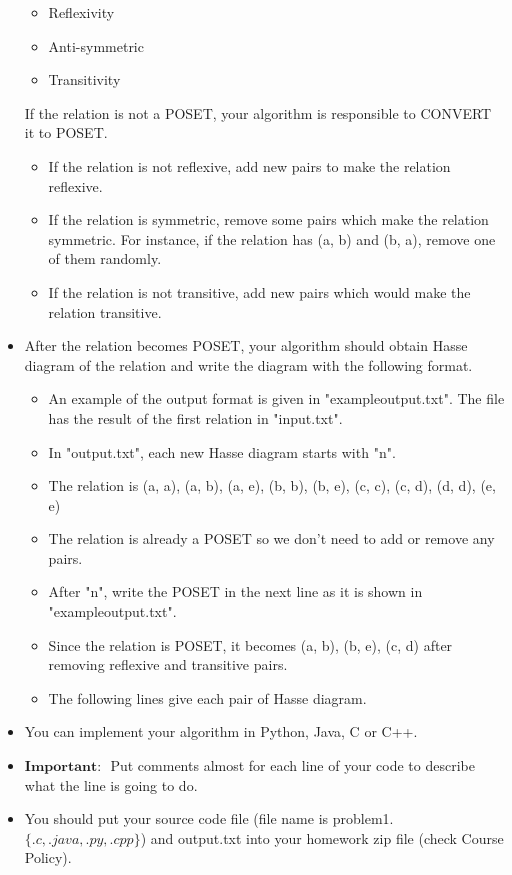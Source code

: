 \documentclass[a4 paper]{article}
\numberwithin{equation}{section}
\newcommand{\0}{\mathbf{0}}
\begin{document}
\begin{itemize}
	\begin{itemize}
		\item Reflexivity
		\item Anti-symmetric
		\item Transitivity 
	\end{itemize}
	If the relation is not a POSET, your algorithm is responsible to CONVERT it to POSET. 
	\begin{itemize}
		\item If the relation is not reflexive, add new pairs to make the relation reflexive.
		\item If the relation is symmetric, remove some pairs which make the relation symmetric. For instance, if the relation has (a, b) and (b, a), remove one of them randomly.
		\item If the relation is not transitive, add new pairs which would make the relation transitive. 
	\end{itemize}
	\item After the relation becomes POSET, your algorithm should obtain Hasse diagram of the relation and write the diagram with the following format. 
	\begin{itemize}
		\item An example of the output format is given in "exampleoutput.txt". The file has the result of the first relation in "input.txt".
		\item In "output.txt", each new Hasse diagram starts with "n".
		\item The relation is (a, a), (a, b), (a, e), (b, b), (b, e), (c, c), (c, d), (d, d), (e, e)
		\item The relation is already a POSET so we don't need to add or remove any pairs.
		\item After "n", write the POSET in the next line as it is shown in "exampleoutput.txt".
		\item Since the relation is POSET, it becomes (a, b), (b, e), (c, d) after removing reflexive and transitive pairs. 
		\item The following lines give each pair of Hasse diagram.
	\end{itemize}	
	\item You can implement your algorithm in Python, Java, C or C++.
	\item $\textbf{Important: }$ Put comments almost for each line of your code to describe what the line is going to do. 
	\item You should put your source code file (file name is problem1.$\{.c, .java, .py, .cpp\}$) and output.txt into your homework zip file (check Course Policy).
\end{itemize}
\end{document}

